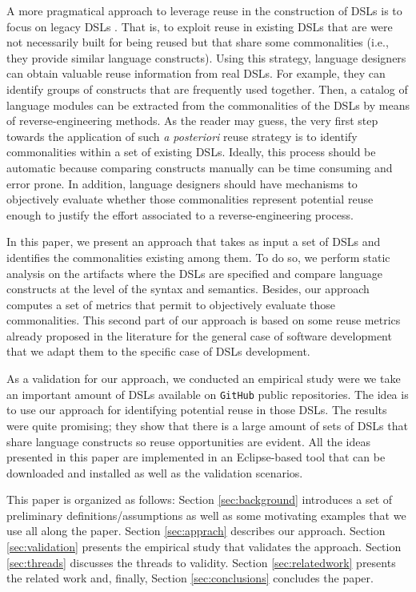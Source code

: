 A more pragmatical approach to leverage reuse in the construction of DSLs is to focus on legacy DSLs \cite{degueule:2015}. That is, to exploit reuse in existing DSLs that are were not necessarily built for being reused but that share some commonalities (i.e., they provide similar language constructs). Using this strategy, language designers can obtain valuable reuse information from real DSLs. For example, they can identify groups of constructs that are frequently used together. Then, a catalog of language modules can be extracted from the commonalities of the DSLs by means of reverse-engineering methods. As the reader may guess, the very first step towards the application of such \textit{a posteriori} reuse strategy is to identify commonalities within a set of existing DSLs. Ideally, this process should be automatic because comparing constructs manually can be time consuming and error prone. In addition, language designers should have mechanisms to objectively evaluate whether those commonalities represent potential reuse enough to justify the effort associated to a reverse-engineering process. 

In this paper, we present an approach that takes as input a set of DSLs and identifies the commonalities existing among them. To do so, we perform static analysis on the artifacts where the DSLs are specified and compare language constructs at the level of the syntax and semantics. Besides, our approach computes a set of metrics that permit to objectively evaluate those commonalities. This second part of our approach is based on some reuse metrics already proposed in the literature for the general case of software development \cite{Berger:2014,Berger:126283} that we adapt them to the specific case of DSLs development.

As a validation for our approach, we conducted an empirical study were we take an important amount of DSLs available on \texttt{GitHub} public repositories. The idea is to use our approach for identifying potential reuse in those DSLs. The results were quite promising; they show that there is a large amount of sets of DSLs that share language constructs so reuse opportunities are evident. All the ideas presented in this paper are implemented in an Eclipse-based tool that can be downloaded and installed as well as the validation scenarios. 

This paper is organized as follows: Section \ref{sec:background} introduces a set of preliminary definitions/assumptions as well as some motivating examples that we use all along the paper. Section \ref{sec:apprach} describes our approach. Section \ref{sec:validation} presents the empirical study that validates the approach. Section \ref{sec:threads} discusses the threads to validity. Section \ref{sec:relatedwork} presents the related work and, finally, Section \ref{sec:conclusions} concludes the paper. 

